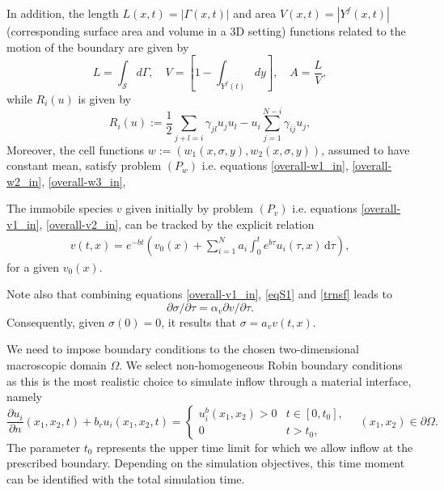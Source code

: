 \documentclass[reqno, 11pt]{amsart}
\numberwithin{equation}{section}
\newcommand{\ee}{{\mathrm{e}}}
\newcommand{\di}[1]{\,\mathrm{d}#1}
\def\be{\begin{equation}}
\def\ee{\end{equation}}
\begin{document}
 In addition, the length $L(x,t)=|\Gamma(x,t)|$ and area $V(x,t)=|Y^f (x,t)|$ (corresponding surface area and volume in a 3D setting) functions related to the motion of the boundary  are given by 
  \be 
  L=\int_{\mathcal{S}}d {\Gamma },\quad V=\left[1-\int_{Y^f{(t)}}  dy\right],\quad A=\frac{L}{V},
         \label{overall-aux}
 \ee
 while $R_i(u)$ is given by 
\be \label{mod1hb}
R_i(u):=\frac{1}{2}\sum_{j+l=i}\gamma_{jl}u_ju_l-u_i\sum_{j=1}^{N-i}\gamma_{ij}u_j,
\ee
 Moreover, the cell functions $w:=(w_1(x,\sigma,y),w_2(x,\sigma,y))$, assumed to have constant mean, satisfy
 problem $(P_w)$ i.e. equations \eqref{overall-w1_in}, \eqref{overall-w2_in}, \eqref{overall-w3_in},
 
The immobile species $v$ given initially by problem $(P_v)$ i.e. equations 
 \eqref{overall-v1_in}, \eqref{overall-v2_in}, can be tracked by the explicit relation
\begin{eqnarray}\label{alter-v}
	v(t,x)=e^{-bt}\left(v_0(x)+\sum_{i=1}^Na_i\int_0^te^{b\tau}u_i(\tau,x)\di{\tau}\right),
\end{eqnarray}
for a given $v_0(x)$.
 
 Note also that combining equations  \eqref{overall-v1_in},  \eqref{eqS1} and \eqref{trnsf} leads to
 \be \label{mod-sigmav}
{\partial \sigma}/{\partial \tau}=\alpha_v {\partial v}/{\partial \tau}.
\ee
 Consequently, given $\sigma(0)=0$, it results that $\sigma=a_v v(t,x)$.
 

We need to impose boundary conditions to the chosen two-dimensional macroscopic domain $\Omega$. We select non-homogeneous  Robin  boundary conditions as this is the most realistic choice  to simulate inflow through a material interface, namely 
 \be \label{mod1b}
 \frac{\partial u_i}{\partial n}(x_1,x_2,t)+ b_r u_i (x_1,x_2,t)=\left\{\begin{array}{cc}
 u_i^b(x_1,x_2)>0 & t\in [0,t_0],\\
 0         & t>t_0,
 \end{array}\right. \quad (x_1,x_2)\in \partial \Omega.
 \ee
 The parameter $t_0$ represents the upper time limit for which we allow inflow at the prescribed boundary. Depending on the simulation objectives, this time moment  can be identified with the total simulation time.
\end{document}
